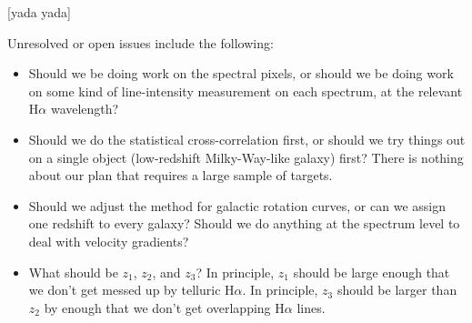 \documentclass[12pt, letterpaper]{article}
\begin{document}
[yada yada]

Unresolved or open issues include the following:
\begin{itemize}
\item
Should we be doing work on the spectral pixels, or should we be doing
work on some kind of line-intensity measurement on each spectrum, at
the relevant H$\alpha$ wavelength?
\item
Should we do the statistical cross-correlation first, or should we try
things out on a single object (low-redshift Milky-Way-like galaxy)
first?  There is nothing about our plan that requires a large sample
of targets.
\item
Should we adjust the method for galactic rotation curves, or can we
assign one redshift to every galaxy?  Should we do anything at the
spectrum level to deal with velocity gradients?
\item
What should be $z_1$, $z_2$, and $z_3$?  In principle, $z_1$ should be
large enough that we don't get messed up by telluric H$\alpha$.  In
principle, $z_3$ should be larger than $z_2$ by enough that we don't
get overlapping H$\alpha$ lines.
\end{itemize}
\end{document}
